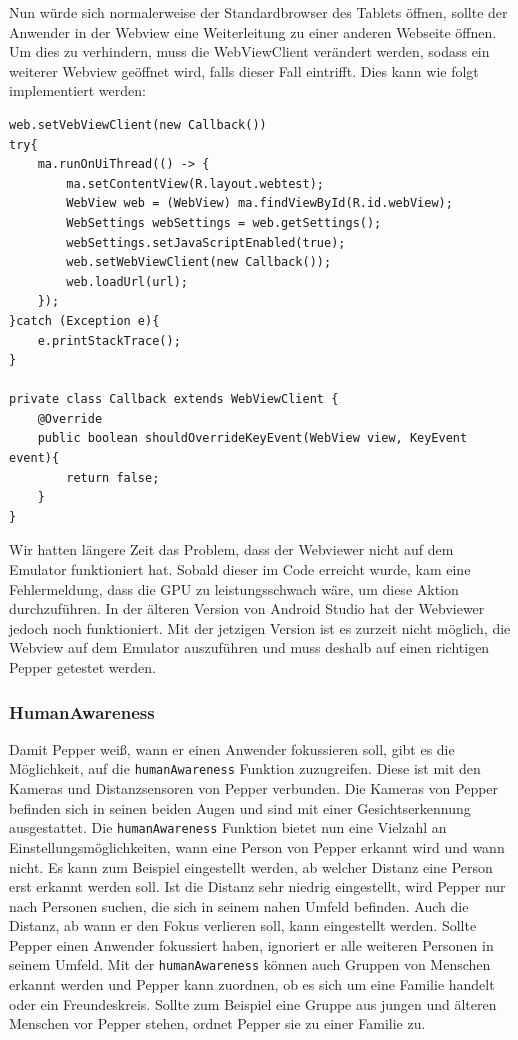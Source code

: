 Nun würde sich normalerweise der Standardbrowser des Tablets öffnen, sollte der Anwender in der Webview eine Weiterleitung zu einer anderen Webseite öffnen. Um dies zu verhindern, muss die WebViewClient verändert werden, sodass ein weiterer Webview geöffnet wird, falls dieser Fall eintrifft. Dies kann wie folgt implementiert werden: \\

\begin{lstlisting}
web.setVebViewClient(new Callback())
try{
    ma.runOnUiThread(() -> {
        ma.setContentView(R.layout.webtest);
        WebView web = (WebView) ma.findViewById(R.id.webView);
        WebSettings webSettings = web.getSettings();
        webSettings.setJavaScriptEnabled(true);
        web.setWebViewClient(new Callback());
        web.loadUrl(url);
    });
}catch (Exception e){
    e.printStackTrace();
}

private class Callback extends WebViewClient {
    @Override
    public boolean shouldOverrideKeyEvent(WebView view, KeyEvent event){
        return false;
    }
}
\end{lstlisting}
Wir hatten längere Zeit das Problem, dass der Webviewer nicht auf dem Emulator funktioniert hat. Sobald dieser im Code erreicht wurde, kam eine Fehlermeldung, dass die GPU zu leistungsschwach wäre, um diese Aktion durchzuführen. In der älteren Version von Android Studio hat der Webviewer 
jedoch noch funktioniert. Mit der jetzigen Version ist es zurzeit nicht möglich, die Webview auf dem Emulator auszuführen und muss deshalb auf einen richtigen Pepper getestet werden.\\

\subsubsection{HumanAwareness}

Damit Pepper weiß, wann er einen Anwender fokussieren soll, gibt es die Möglichkeit, auf die \verb|humanAwareness| Funktion zuzugreifen. Diese ist mit den Kameras und Distanzsensoren von Pepper verbunden. Die Kameras von Pepper befinden sich in seinen beiden Augen und sind mit einer Gesichtserkennung ausgestattet. Die \verb|humanAwareness| Funktion bietet nun eine Vielzahl an Einstellungsmöglichkeiten, wann eine Person von Pepper erkannt wird und wann nicht. Es kann zum Beispiel eingestellt werden, ab welcher Distanz eine Person erst erkannt werden soll. Ist die Distanz sehr niedrig eingestellt, wird Pepper nur nach Personen suchen, die sich in seinem nahen Umfeld befinden. Auch die Distanz, ab wann er den Fokus verlieren soll, kann eingestellt werden. Sollte Pepper einen Anwender fokussiert haben, ignoriert er alle weiteren Personen in seinem Umfeld. Mit der \verb|humanAwareness| können auch Gruppen von Menschen erkannt werden und Pepper kann zuordnen, ob es sich um eine Familie handelt oder ein Freundeskreis. Sollte zum Beispiel eine Gruppe aus jungen und älteren Menschen vor Pepper stehen, ordnet Pepper sie zu einer Familie zu.\\

